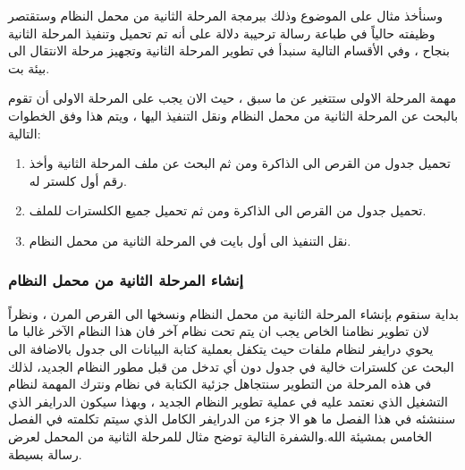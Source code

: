 \documentclass[document.tex]{subfiles}
\begin{document}
وسنأخذ مثال على الموضوع وذلك ببرمجة المرحلة الثانية من محمل النظام  وستقتصر وظيفته حالياً في طباعة رسالة ترحيبة دلالة على أنه تم تحميل وتنفيذ المرحلة الثانية بنجاح ، وفي الأقسام التالية سنبدأ في تطوير المرحلة الثانية وتجهيز مرحلة الانتقال الى بيئة  بت.

مهمة المرحلة الاولى ستتغير عن ما سبق ، حيث الان يجب على المرحلة الاولى أن تقوم بالبحث عن المرحلة الثانية من محمل النظام ونقل التنفيذ اليها ، ويتم هذا وفق الخطوات التالية:

\begin{enumerate}
\item تحميل جدول  من القرص الى الذاكرة ومن ثم البحث عن ملف المرحلة الثانية وأخذ رقم أول كلستر له.

\item تحميل جدول  من القرص الى الذاكرة ومن ثم تحميل جميع الكلسترات للملف.

\item نقل التنفيذ الى أول بايت في المرحلة الثانية من محمل النظام.
\end{enumerate}

\subsubsection{إنشاء المرحلة الثانية من محمل النظام}

بداية سنقوم بإنشاء المرحلة الثانية من محمل النظام ونسخها الى القرص المرن ، ونظراً لان تطوير نظامنا الخاص يجب ان يتم تحت نظام آخر فان هذا النظام الآخر غالبا ما يحوي درايفر لنظام ملفات  حيث يتكفل بعملية كتابة البيانات الى جدول  بالاضافة الى البحث عن كلسترات خالية في جدول  دون أي تدخل من قبل مطور النظام الجديد، لذلك في هذه المرحلة من التطوير سنتجاهل جزئية الكتابة في نظام  ونترك المهمة لنظام التشغيل الذي نعتمد عليه في عملية تطوير النظام الجديد ، وبهذا سيكون الدرايفر الذي سننشئه في هذا الفصل ما هو الا جزء من الدرايفر الكامل الذي سيتم تكلمته في الفصل الخامس بمشيئة الله.والشفرة التالية توضح مثال للمرحلة الثانية من المحمل لعرض رسالة بسيطة.

\begin{english}
\lstset{numberstyle=\tiny,numbers=left,stepnumber=1,numbersep=5pt,tabsize=2,extendedchars=true,breaklines=true,frame=b,showspaces=false, showtabs=false,xleftmargin=10pt,framexleftmargin=10pt,framexrightmargin=5pt,framexbottommargin=4pt,showstringspaces=false,language=[x86masm]Assembler}


\end{english}
\end{document}
